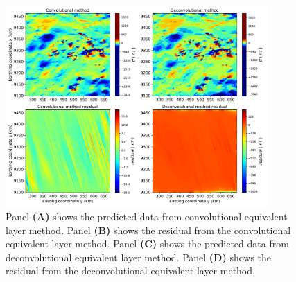\begin{figure}[htbp]
	\begin{center}
		\includegraphics[width=10cm]{Fig/carajas_tf_predito_1000x500}
	\end{center}
	\caption{Panel \textbf{(A)} shows the predicted data from convolutional equivalent layer method. Panel \textbf{(B)} shows the residual from the convolutional equivalent layer method. Panel \textbf{(C)} shows the predicted data from deconvolutional equivalent layer method. Panel \textbf{(D)} shows the residual from the deconvolutional equivalent layer method.}
	\label{fig:12}
\end{figure}



%


